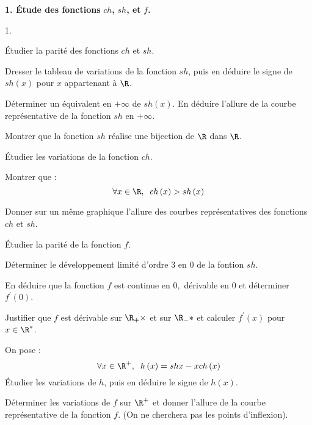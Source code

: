 \documentclass[11pt]{article}%
\begin{document}
\noindent \textbf{1. Étude des fonctions }$ch$\textbf{, }$sh$\textbf{,
et }$f $\textbf{.}

\begin{noliste}{1.}
 \setlength{\itemsep}{4mm}
\item Étudier la parité des fonctions $ch$ et $sh$.

\item Dresser le tableau de variations de la fonction $sh$, puis en
déduire
le signe de $sh\left( x\right) $ pour $x$ appartenant à $\R$.

\item Déterminer un équivalent en $ + \infty $ de $sh(x)$. En déduire
l'allure
de la courbe représentative de la fonction $sh$ en $ + \infty $.

\item Montrer que la fonction $sh$ réalise une bijection de $\R$
dans $\R$.

\item Étudier les variations de la fonction $ch$.

\item Montrer que : 
\[
\forall x\in \R,\;\;ch\left( x\right) >sh\left( x\right)
\]

\item Donner sur un même graphique l'allure des courbes représentatives
des
fonctions $ch$ et $sh$.

\item Étudier la parité de la fonction $f$.

\item Déterminer le développement limité d'ordre 3 en 0 de la fontion
$sh.$

\item En déduire que la fonction $f$ est continue en $0,$ dérivable en
0 et déterminer $f^{\prime }\left( 0\right) $.

\item Justifier que $f$ est dérivable sur $\R_{+}{\times }$ et sur
$\R_{-}{* }$ et calculer $f^{\prime }\left( x\right) $ pour $x\in \R^{*
}$.

\item On pose : 
\[
\forall x\in \R^{+},\;\;h\left( x\right) = shx-xch\left( x\right)
\]
Étudier les variations de $h$, puis en déduire le signe de $h\left(
x\right) $.

\item Déterminer les variations de $f$ sur $\R^{+}$ et donner
l'allure de la courbe représentative de la fonction $f$. (On ne
cherchera
pas les points d'inflexion).
\end{noliste}
\end{document}
